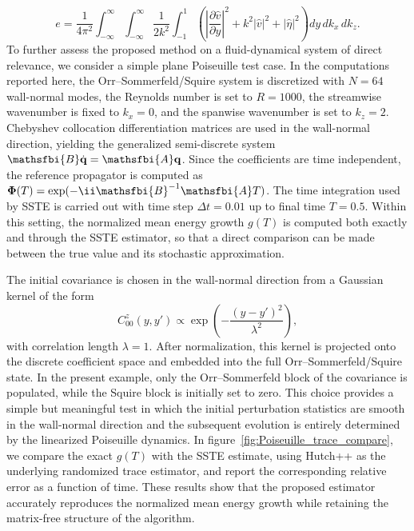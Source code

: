 \begin{appendices}
\begin{equation}
  e
  =
  \frac{1}{4\pi^2}
  \int_{-\infty}^{\infty}
  \int_{-\infty}^{\infty}
  \frac{1}{2k^2}
  \int_{-1}^{1}
  \left(
    \left|\frac{\partial \hat{v}}{\partial y}\right|^2
    +
    k^2 |\hat{v}|^2
    +
    |\hat{\eta}|^2
  \right)
  dy\, dk_x\, dk_z.
\end{equation}
To further assess the proposed method on a fluid-dynamical system of direct relevance, we consider a simple plane Poiseuille test case. In the computations reported here, the Orr--Sommerfeld/Squire system is discretized with \(N=64\) wall-normal modes, the Reynolds number is set to \(R=1000\), the streamwise wavenumber is fixed to \(k_x=0\), and the spanwise wavenumber is set to \(k_z=2\). Chebyshev collocation differentiation matrices are used in the wall-normal direction, yielding the generalized semi-discrete system \(\mathsfbi{B}\dot{\mathbf{q}}=\mathsfbi{A}\mathbf{q}\). Since the coefficients are time independent, the reference propagator is computed as \(\boldsymbol{\Phi}(T)=\exp(-\ii\mathsfbi{B}^{-1}\mathsfbi{A}T)\). The time integration used by SSTE is carried out with time step \(\Delta t=0.01\) up to final time \(T=0.5\). Within this setting, the normalized mean energy growth \(g(T)\) is computed both exactly and through the SSTE estimator, so that a direct comparison can be made between the true value and its stochastic approximation.

The initial covariance is chosen in the wall-normal direction from a Gaussian kernel of the form
\begin{equation}
  C_{00}^{z}(y,y')
  \propto
  \exp\!\left(
    -\frac{(y-y')^2}{\lambda^2}
  \right),
\end{equation}
with correlation length \(\lambda=1\). After normalization, this kernel is projected onto the discrete coefficient space and embedded into the full Orr--Sommerfeld/Squire state. In the present example, only the Orr--Sommerfeld block of the covariance is populated, while the Squire block is initially set to zero. This choice provides a simple but meaningful test in which the initial perturbation statistics are smooth in the wall-normal direction and the subsequent evolution is entirely determined by the linearized Poiseuille dynamics. In figure~\ref{fig:Poiseuille_trace_compare}, we compare the exact \(g(T)\) with the SSTE estimate, using Hutch++ as the underlying randomized trace estimator, and report the corresponding relative error as a function of time. These results show that the proposed estimator accurately reproduces the normalized mean energy growth while retaining the matrix-free structure of the algorithm.



\end{appendices}
